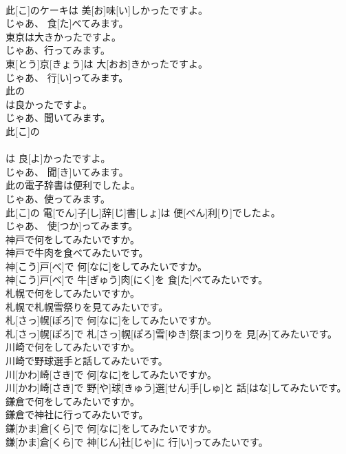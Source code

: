 \documentclass[8pt]{extreport}
\begin{document}
\begin{CJK}{UTF8}{min}
\\	此[こ]のケーキは 美[お]味[い]しかったですよ。 
\\	じゃあ、 食[た]べてみます。
\\	東京は大きかったですよ。 
\\	じゃあ、行ってみます。	
\\	東[とう]京[きょう]は 大[おお]きかったですよ。 
\\	じゃあ、 行[い]ってみます。
\\	此の
\\	は良かったですよ。 
\\	じゃあ、聞いてみます。	
\\	此[こ]の 
\\	[シー]
\\	[ディー]は 良[よ]かったですよ。 
\\	じゃあ、 聞[き]いてみます。
\\	此の電子辞書は便利でしたよ。 
\\	じゃあ、使ってみます。	
\\	此[こ]の 電[でん]子[し]辞[じ]書[しょ]は 便[べん]利[り]でしたよ。 
\\	じゃあ、 使[つか]ってみます。
\\	神戸で何をしてみたいですか。 
\\	神戸で牛肉を食べてみたいです。	
\\	神[こう]戸[べ]で 何[なに]をしてみたいですか。 
\\	神[こう]戸[べ]で 牛[ぎゅう]肉[にく]を 食[た]べてみたいです。
\\	札幌で何をしてみたいですか。 
\\	札幌で札幌雪祭りを見てみたいです。	
\\	札[さっ]幌[ぽろ]で 何[なに]をしてみたいですか。 
\\	札[さっ]幌[ぽろ]で 札[さっ]幌[ぽろ]雪[ゆき]祭[まつ]りを 見[み]てみたいです。
\\	川崎で何をしてみたいですか。 
\\	川崎で野球選手と話してみたいです。	
\\	川[かわ]崎[さき]で 何[なに]をしてみたいですか。 
\\	川[かわ]崎[さき]で 野[や]球[きゅう]選[せん]手[しゅ]と 話[はな]してみたいです。
\\	鎌倉で何をしてみたいですか。 
\\	鎌倉で神社に行ってみたいです。	
\\	鎌[かま]倉[くら]で 何[なに]をしてみたいですか。 
\\	鎌[かま]倉[くら]で 神[じん]社[じゃ]に 行[い]ってみたいです。

\end{CJK}
\end{document}
